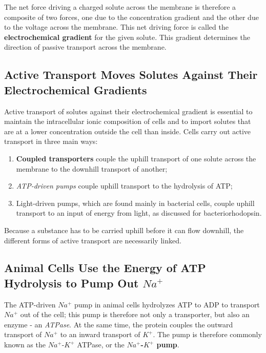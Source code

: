 The net force driving a charged solute across the membrane is therefore
a composite of two forces, one due to the concentration gradient and the
other due to the voltage across the membrane. This net driving force is
called the \textbf{electrochemical gradient} for the given solute. This gradient
determines the direction of passive transport across the membrane.

\subsection{Active Transport Moves Solutes Against Their Electrochemical Gradients}

Active transport of solutes against their electrochemical gradient is essential to maintain
the intracellular ionic composition of cells and to import solutes that are
at a lower concentration outside the cell than inside. Cells carry out active
transport in three main ways: 

\begin{enumerate}
\item \textbf{Coupled transporters} couple
the uphill transport of one solute across the membrane to the downhill
transport of another;
\item \textit{ATP-driven pumps} couple uphill transport to the
hydrolysis of ATP;
\item Light-driven pumps, which are found mainly in bacterial
cells, couple uphill transport to an input of energy from light, as
discussed for bacteriorhodopsin.
\end{enumerate}

Because a substance has to be carried uphill before it can flow downhill,
the different forms of active transport are necessarily linked.

\subsection{Animal Cells Use the Energy of ATP Hydrolysis to Pump Out $Na^{+}$}

The ATP-driven $Na^{+}$ pump in animal cells hydrolyzes ATP to ADP to transport
$Na^{+}$ out of the cell; this pump is therefore not only a transporter,
but also an enzyme - an \textit{ATPase}. At the same time, the protein couples
the outward transport of $Na^{+}$ to an inward transport of $K^{+}$. The pump is
therefore commonly known as the $Na^{+}$-$K^{+}$ ATPase, or the \textbf{$Na^{+}$-$K^{+}$ pump}.

